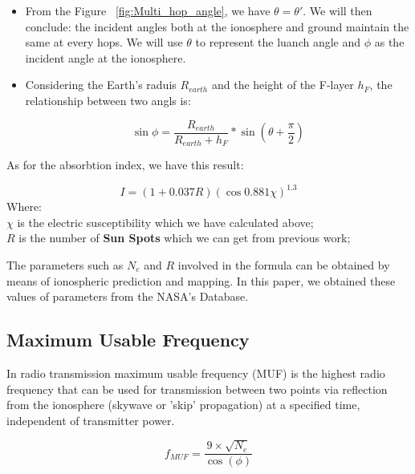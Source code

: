 \documentclass{mcmthesis}
\begin{document}
    \begin{itemize}
      \item From the Figure ~\ref{fig:Multi_hop_angle}, we have $\theta = \theta'$. We will then conclude: the incident angles both at the ionosphere and ground maintain the same at every hops. We will use $\theta$ to represent the luanch angle and $\phi$ as the incident angle at the ionosphere. \\
      \item Considering the Earth's raduis $R_{earth}$ and the height of the F-layer $h_F$, the relationship between two angls is:

        \begin{equation}\label{eq:getPHI}
          \sin\phi = \frac{R_{earth}}{R_{earth} + h_{F}} * \sin(\theta + \frac{\pi}{2})
        \end{equation}

    \end{itemize}



    As for the absorbtion index, we have this result:

     \begin{equation}\label{eq:IonosphereAbsorbtionIndex}
       I = (1 + 0.037 R)(\cos0.881\chi)^{1.3}
     \end{equation}
     Where:\\
     $\chi$ is the electric susceptibility which we have calculated above;\\
     $R$ is the number of \textbf{Sun Spots} which we can get from previous work\cite{dayandyearTECchange};

     The parameters such as $N_{e}$ and $R$ involved in the formula can be obtained by means of ionospheric prediction and mapping. In this paper, we obtained these values of parameters from the NASA's Database.

\subsection{Maximum Usable Frequency}

    In radio transmission maximum usable frequency (MUF) is the highest radio frequency that can be used for transmission between two points via reflection from the ionosphere (skywave or 'skip' propagation) at a specified time, independent of transmitter power\cite{davies1990ionospheric}.

    \begin{equation}\label{MUF_def}
      f_{MUF} = \frac{ 9 \times \sqrt{N_e} }{\cos(\phi)}
    \end{equation}
\end{document}
